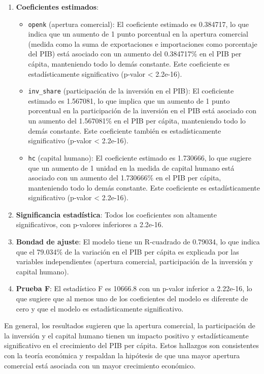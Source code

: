 \documentclass[
]{article}
\providecommand{\tightlist}{%
  \setlength{\itemsep}{0pt}\setlength{\parskip}{0pt}}
\begin{document}
\begin{enumerate}
\def\labelenumi{\arabic{enumi}.}
\item
  \textbf{Coeficientes estimados}:

  \begin{itemize}
  \tightlist
  \item
    \texttt{openk} (apertura comercial): El coeficiente estimado es
    0.384717, lo que indica que un aumento de 1 punto porcentual en la
    apertura comercial (medida como la suma de exportaciones e
    importaciones como porcentaje del PIB) está asociado con un aumento
    del 0.384717\% en el PIB per cápita, manteniendo todo lo demás
    constante. Este coeficiente es estadísticamente significativo
    (p-valor \textless{} 2.2e-16).
  \item
    \texttt{inv\_share} (participación de la inversión en el PIB): El
    coeficiente estimado es 1.567081, lo que implica que un aumento de 1
    punto porcentual en la participación de la inversión en el PIB está
    asociado con un aumento del 1.567081\% en el PIB per cápita,
    manteniendo todo lo demás constante. Este coeficiente también es
    estadísticamente significativo (p-valor \textless{} 2.2e-16).
  \item
    \texttt{hc} (capital humano): El coeficiente estimado es 1.730666,
    lo que sugiere que un aumento de 1 unidad en la medida de capital
    humano está asociado con un aumento del 1.730666\% en el PIB per
    cápita, manteniendo todo lo demás constante. Este coeficiente es
    estadísticamente significativo (p-valor \textless{} 2.2e-16).
  \end{itemize}
\item
  \textbf{Significancia estadística}: Todos los coeficientes son
  altamente significativos, con p-valores inferiores a 2.2e-16.
\item
  \textbf{Bondad de ajuste}: El modelo tiene un R-cuadrado de 0.79034,
  lo que indica que el 79.034\% de la variación en el PIB per cápita es
  explicada por las variables independientes (apertura comercial,
  participación de la inversión y capital humano).
\item
  \textbf{Prueba F}: El estadístico F es 10666.8 con un p-valor inferior
  a 2.22e-16, lo que sugiere que al menos uno de los coeficientes del
  modelo es diferente de cero y que el modelo es estadísticamente
  significativo.
\end{enumerate}

En general, los resultados sugieren que la apertura comercial, la
participación de la inversión y el capital humano tienen un impacto
positivo y estadísticamente significativo en el crecimiento del PIB per
cápita. Estos hallazgos son consistentes con la teoría económica y
respaldan la hipótesis de que una mayor apertura comercial está asociada
con un mayor crecimiento económico.
\end{document}
